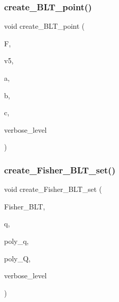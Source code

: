 \subsubsection{\texorpdfstring{create\+\_\+\+B\+L\+T\+\_\+point()}{create\_BLT\_point()}}
{\footnotesize\ttfamily void create\+\_\+\+B\+L\+T\+\_\+point (\begin{DoxyParamCaption}\item[{\mbox{\hyperlink{classfinite__field}{finite\+\_\+field}} $\ast$}]{F,  }\item[{\mbox{\hyperlink{galois_8h_a09fddde158a3a20bd2dcadb609de11dc}{I\+NT}} $\ast$}]{v5,  }\item[{\mbox{\hyperlink{galois_8h_a09fddde158a3a20bd2dcadb609de11dc}{I\+NT}}}]{a,  }\item[{\mbox{\hyperlink{galois_8h_a09fddde158a3a20bd2dcadb609de11dc}{I\+NT}}}]{b,  }\item[{\mbox{\hyperlink{galois_8h_a09fddde158a3a20bd2dcadb609de11dc}{I\+NT}}}]{c,  }\item[{\mbox{\hyperlink{galois_8h_a09fddde158a3a20bd2dcadb609de11dc}{I\+NT}}}]{verbose\+\_\+level }\end{DoxyParamCaption})}

\mbox{\label{data_8_c_ad970fc96c238a422a64338691f8b91cc}} 
\subsubsection{\texorpdfstring{create\+\_\+\+Fisher\+\_\+\+B\+L\+T\+\_\+set()}{create\_Fisher\_BLT\_set()}}
{\footnotesize\ttfamily void create\+\_\+\+Fisher\+\_\+\+B\+L\+T\+\_\+set (\begin{DoxyParamCaption}\item[{\mbox{\hyperlink{galois_8h_a09fddde158a3a20bd2dcadb609de11dc}{I\+NT}} $\ast$}]{Fisher\+\_\+\+B\+LT,  }\item[{\mbox{\hyperlink{galois_8h_a09fddde158a3a20bd2dcadb609de11dc}{I\+NT}}}]{q,  }\item[{const \mbox{\hyperlink{galois_8h_ab6cc7b4aeb6ea31aba2b3fbfc83ff5e6}{B\+Y\+TE}} $\ast$}]{poly\+\_\+q,  }\item[{const \mbox{\hyperlink{galois_8h_ab6cc7b4aeb6ea31aba2b3fbfc83ff5e6}{B\+Y\+TE}} $\ast$}]{poly\+\_\+Q,  }\item[{\mbox{\hyperlink{galois_8h_a09fddde158a3a20bd2dcadb609de11dc}{I\+NT}}}]{verbose\+\_\+level }\end{DoxyParamCaption})}

